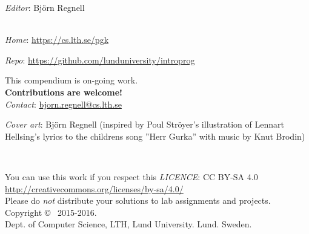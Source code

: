 
\clearpage\null\thispagestyle{empty}
\vfill

{
\setlength{\parindent}{0pt}
\emph{Editor}: Björn Regnell \\ 


\\ \newline

\emph{Home}: \url{https://cs.lth.se/pgk} \newline

\emph{Repo}: \url{https://github.com/lunduniversity/introprog} \\ \newline

This compendium is on-going work. \\ \textbf{Contributions are welcome!} \\ 
\emph{Contact}: \url{bjorn.regnell@cs.lth.se}
\\ \newline

\emph{Cover art}: Björn Regnell (inspired by Poul Ströyer's illustration of Lennart Hellsing's lyrics to  the childrens song ''Herr Gurka'' with music by Knut Brodin)\\ \newline

~\\ \newline

You can use this work if you respect this \emph{LICENCE}: CC BY-SA 4.0 \\
\url{http://creativecommons.org/licenses/by-sa/4.0/} \\
Please do \emph{not} distribute your solutions to lab assignments and projects. 
\\ \newline
Copyright \copyright~ 2015-2016. \\
Dept. of Computer Science, LTH, Lund University. Lund. Sweden.\\
}